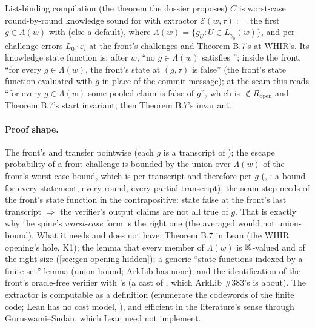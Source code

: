 \begin{define}{List-binding compilation (the theorem the dossier proposes)}
$C$ is worst-case round-by-round knowledge sound for  with extractor
$\mathcal{E}(w, τ) :=$ the first $g ∈ Λ(w)$ with  (else a default), where
$Λ(w) = \{g_U : U ∈ L_{γ_0}(w)\}$, and per-challenge errors $L_0·ε_i$ at the front's challenges and
Theorem B.7's at WHIR's. Its knowledge state function is: after $w$, ``no $g ∈ Λ(w)$ satisfies
''; inside the front, ``for every $g ∈ Λ(w)$, the front's state at $(g, τ)$ is false''
(the front's state function evaluated with $g$ in place of the commit message); at the seam this
reads ``for every $g ∈ Λ(w)$ some pooled claim is false of $g$'', which is $∉ R_{\mathrm{open}}$ and
Theorem B.7's start invariant; then Theorem B.7's invariant.
\end{define}

\paragraph{Proof shape.} The front's  and  transfer pointwise
(each $g$ is a transcript of ); the escape probability of a front challenge is bounded by
the union over $Λ(w)$ of the front's worst-case bound, which is per transcript and therefore per $g$
(, : a bound for
every statement, every round, every partial transcript); the seam step needs  of
the front's state function in the contrapositive: state false at the front's last transcript $⇒$ the
verifier's output claims are not all true of $g$. That is exactly why the spine's \emph{worst-case}
form is the right one (the averaged  would not union-bound). What it
needs and does not have: Theorem B.7 in Lean (the WHIR opening's hole, K1); the lemma that every member of
$Λ(w)$ is $\mathbb{K}$-valued and of the right size (\cref{sec:gen-opening-hidden}); a generic ``state
functions indexed by a finite set'' lemma (union bound; ArkLib has none); and the identification of
the front's oracle-free verifier with 's (a cast of , which ArkLib
\#383's  is about). The extractor is computable as a definition (enumerate the
codewords of the finite code; Lean has no cost model, ), and efficient in the
literature's sense through Guruswami--Sudan, which Lean need not implement.

